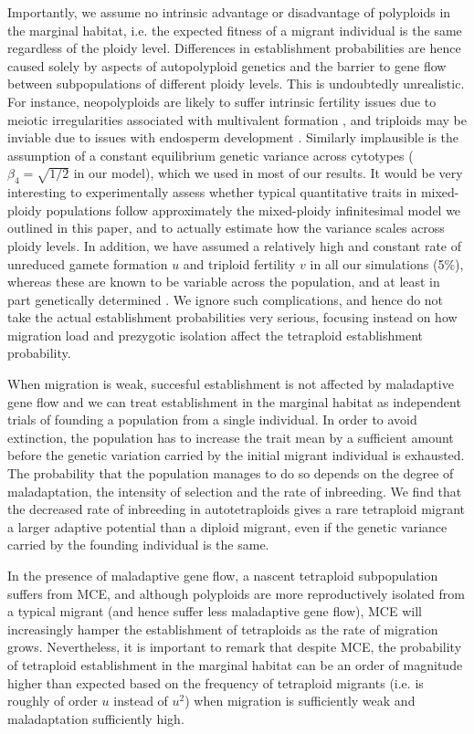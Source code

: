 \documentclass[12pt,a4paper]{article}
\begin{document}
Importantly, we assume no intrinsic advantage or disadvantage of polyploids in
the marginal habitat, i.e. the expected fitness of a migrant individual is the
same regardless of the ploidy level.
Differences in establishment probabilities are hence caused solely by aspects
of autopolyploid genetics and the barrier to gene flow between subpopulations
of different ploidy levels.
This is undoubtedly unrealistic.
For instance, neopolyploids are likely to suffer intrinsic fertility issues due
to meiotic irregularities associated with multivalent formation
\citep{bomblies2016,novikova2023}, and triploids may be inviable due to
issues with endosperm development \citep{bretagnolle1995}.
Similarly implausible is the assumption of a constant equilibrium genetic
variance across cytotypes ($\beta_4=\sqrt{1/2}$ in our model), which we used in
most of our results.
It would be very interesting to experimentally assess whether typical
quantitative traits in mixed-ploidy populations follow approximately the
mixed-ploidy infinitesimal model we outlined in this paper, and to actually
estimate how the variance scales across ploidy levels.
In addition, we have assumed a relatively high and constant rate of unreduced
gamete formation $u$ and triploid fertility $v$ in all our simulations (5\%),
whereas these are known to be variable across the population, and at least in
part genetically determined \citep{kreiner2017,clo2022c}.
We ignore such complications, and hence do not take the actual establishment
probabilities very serious, focusing instead on how migration load and
prezygotic isolation affect the tetraploid establishment probability.

When migration is weak, succesful establishment is not affected by
maladaptive gene flow and we can treat establishment in the marginal habitat as
independent trials of founding a population from a single individual.
In order to avoid extinction, the population has to increase the trait mean
by a sufficient amount before the genetic variation carried by the initial
migrant individual is exhausted.
The probability that the population manages to do so depends on the degree of
maladaptation, the intensity of selection and the rate of inbreeding.
We find that the decreased rate of inbreeding in autotetraploids gives a
rare tetraploid migrant a larger adaptive potential than a diploid migrant,
even if the genetic variance carried by the founding individual is the same.

In the presence of maladaptive gene flow, a nascent tetraploid subpopulation
suffers from MCE, and although polyploids are more reproductively isolated from
a typical migrant (and hence suffer less maladaptive gene flow), MCE will
increasingly hamper the establishment of tetraploids as the rate of migration
grows.
Nevertheless, it is important to remark that despite MCE, the probability of
tetraploid establishment in the marginal habitat can be an order of magnitude
higher than expected based on the frequency of tetraploid migrants (i.e. is
roughly of order $u$ instead of $u^2$) when migration is sufficiently weak and
maladaptation sufficiently high.
\end{document}
